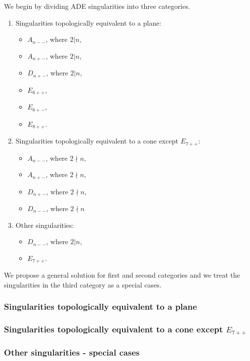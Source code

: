 We begin by dividing ADE singularities into three categories.
\begin{enumerate}
    \item Singularities topologically equivalent to a plane:
    \begin{itemize}
        \item $A_{n--}$, where $2|n$,
        \item $A_{n+-}$, where $2|n$,
        \item $D_{n+-}$, where $2|n$,
        \item $E_{6++}$, 
        \item $E_{6+-}$,
        \item $E_{8++}$.
    \end{itemize}
    \item Singularities topologically equivalent to a cone except $E_{7++}$:
    \begin{itemize}
        \item $A_{n--}$, where $2 \nmid n$,
        \item $A_{n+-}$, where $2 \nmid n$,
        \item $D_{n+-}$, where $2 \nmid n$,
        \item $D_{n--}$, where $2 \nmid n$
    \end{itemize}
    \item Other singularities:
    \begin{itemize}
        \item $D_{n--}$, where $2|n$,
        \item $E_{7++}$.
    \end{itemize}
\end{enumerate}

We propose a general solution for first and second categories and we treat the
singularities in the third category as a special cases.

\subsubsection*{Singularities topologically equivalent to a plane}
\subsubsection*{Singularities topologically equivalent to a cone except $E_{7++}$}
\subsubsection*{Other singularities - special cases}

